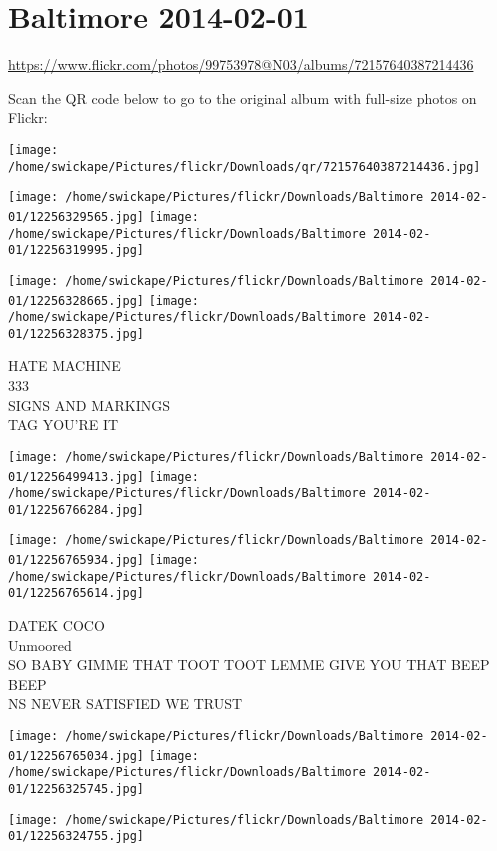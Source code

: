 \documentclass[10pt,letterpaper]{article}
\title{}
\author{}
\date{}
\begin{document}
\section*{Baltimore 2014-02-01}

\url{https://www.flickr.com/photos/99753978@N03/albums/72157640387214436}

Scan the QR code below to go to the original album with full-size photos on Flickr:

\texttt{[image: /home/swickape/Pictures/flickr/Downloads/qr/72157640387214436.jpg]}
\pagebreak

\texttt{[image: /home/swickape/Pictures/flickr/Downloads/Baltimore 2014-02-01/12256329565.jpg]}
\texttt{[image: /home/swickape/Pictures/flickr/Downloads/Baltimore 2014-02-01/12256319995.jpg]}

\texttt{[image: /home/swickape/Pictures/flickr/Downloads/Baltimore 2014-02-01/12256328665.jpg]}
\texttt{[image: /home/swickape/Pictures/flickr/Downloads/Baltimore 2014-02-01/12256328375.jpg]}

HATE MACHINE\\
333\\
SIGNS AND MARKINGS\\
TAG YOU'RE IT
\pagebreak

\texttt{[image: /home/swickape/Pictures/flickr/Downloads/Baltimore 2014-02-01/12256499413.jpg]}
\texttt{[image: /home/swickape/Pictures/flickr/Downloads/Baltimore 2014-02-01/12256766284.jpg]}

\texttt{[image: /home/swickape/Pictures/flickr/Downloads/Baltimore 2014-02-01/12256765934.jpg]}
\texttt{[image: /home/swickape/Pictures/flickr/Downloads/Baltimore 2014-02-01/12256765614.jpg]}

DATEK COCO\\
Unmoored\\
SO BABY GIMME THAT TOOT TOOT LEMME GIVE YOU THAT BEEP BEEP\\
NS NEVER SATISFIED WE TRUST
\pagebreak

\texttt{[image: /home/swickape/Pictures/flickr/Downloads/Baltimore 2014-02-01/12256765034.jpg]}
\texttt{[image: /home/swickape/Pictures/flickr/Downloads/Baltimore 2014-02-01/12256325745.jpg]}

\vspace{0.25in}
\texttt{[image: /home/swickape/Pictures/flickr/Downloads/Baltimore 2014-02-01/12256324755.jpg]}
\end{document}
